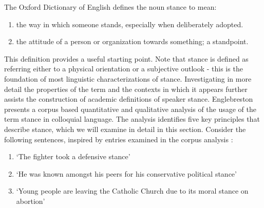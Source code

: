 \documentclass[Dissertation.tex]{subfiles}
\begin{document}
The Oxford Dictionary of English  \cite{StanceOxfordReference} defines the noun stance to mean:

\begin{displayquote}
	\begin{enumerate}
		\item the way in which someone stands, especially when deliberately adopted.
		\item the attitude of a person or organization towards something; a standpoint.
	\end{enumerate}
\end{displayquote}

This definition provides a useful starting point. Note that stance is defined as referring either to a physical orientation or a subjective outlook - this is the foundation of most linguistic characterizations of stance. Investigating in more detail the properties of the term and the contexts in which it appears further assists the construction of academic definitions of speaker stance. Englebreston \cite{englebretsonStancetakingDiscourseSubjectivity2007} presents a corpus based quantitative and qualitative analysis of the usage of the term stance in colloquial language. The analysis identifies five key principles that describe stance, which we will examine in detail in this section. Consider the following sentences, inspired by entries examined in the corpus analysis \cite{englebretsonStancetakingDiscourseSubjectivity2007}:


\begin{enumerate}
	\renewcommand{\labelenumi}{(\Alph{enumi})}
	\item `The fighter took a defensive stance'
	\item `He was known amongst his peers for his conservative political stance'
	\item `Young people are leaving the Catholic Church due to its moral stance on abortion'
	\
\end{enumerate}
\end{document}
